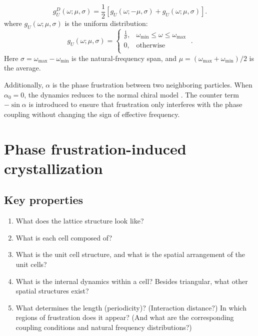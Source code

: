 \documentclass{article}
\begin{document}
\begin{equation}
    g_U^{D}\left( \omega ;\mu,\sigma\right) 
    =\frac{1}{2}\left [
    g_U\left( \omega ;-\mu,\sigma\right) + 
    g_U\left( \omega ; \mu,\sigma\right) \right ].
    \label{eq:uniform2}
\end{equation}
where $g_U\left( \omega ;\mu ,\sigma \right)$ is the uniform distribution:
\begin{equation}
    g_U\left( \omega ;\mu ,\sigma \right) =\begin{cases}
	\frac{1}{\sigma},&		\omega _{\min}\leqslant \omega \leqslant \omega _{\max}\\
	0,&		\mathrm{otherwise}\\
\end{cases}\;.
\label{eq:uniform}
\end{equation}
Here $\sigma = \omega_{\max}-\omega _{\min}$ is the natural-frequency span, and $\mu = (\omega_{\max}+\omega _{\min})/2$ is the average.

Additionally, $\alpha$ is the phase frustration between two neighboring particles. When $\alpha_0=0$, the dynamics reduces to the normal chiral model \cite{LU2025115794}. 
The counter term $-\sin\alpha$ is introduced to ensure that frustration only interferes with the phase coupling without changing the sign of effective frequency. 

\section{Phase frustration-induced crystallization}
\subsection{Key properties}
\begin{enumerate}
    \item What does the lattice structure look like?
    \item What is each cell composed of?
    \item What is the unit cell structure, and what is the spatial arrangement of the unit cells?
    \item What is the internal dynamics within a cell?
    Besides triangular, what other spatial structures exist?
    \item What determines the length (periodicity)? (Interaction distance?)
    In which regions of frustration does it appear? (And what are the corresponding coupling conditions and natural frequency distributions?)
\end{enumerate}
\end{document}
